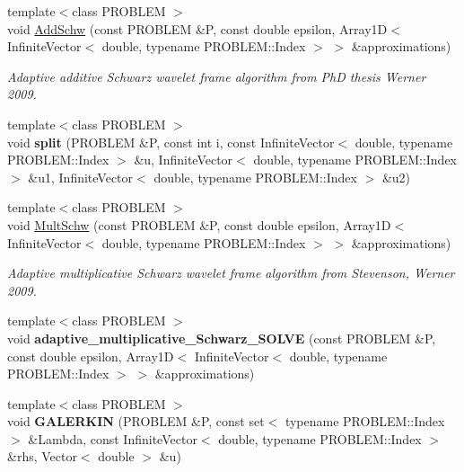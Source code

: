 \begin{CompactItemize}
\item 
{\footnotesize template$<$class PROBLEM $>$ }\\void \hyperlink{namespaceFrameTL_fae0f5be715e2324d15ca01a18665855}{AddSchw} (const PROBLEM \&P, const double epsilon, Array1D$<$ InfiniteVector$<$ double, typename PROBLEM::Index $>$ $>$ \&approximations)
\begin{CompactList}\small\item\em Adaptive additive Schwarz wavelet frame algorithm from PhD thesis Werner 2009. \item\end{CompactList}\item 
\hypertarget{namespaceFrameTL_9af3764c23011a0c0d4ceb60995cae01}{
{\footnotesize template$<$class PROBLEM $>$ }\\void \textbf{split} (PROBLEM \&P, const int i, const InfiniteVector$<$ double, typename PROBLEM::Index $>$ \&u, InfiniteVector$<$ double, typename PROBLEM::Index $>$ \&u1, InfiniteVector$<$ double, typename PROBLEM::Index $>$ \&u2)}
\label{namespaceFrameTL_9af3764c23011a0c0d4ceb60995cae01}

\item 
{\footnotesize template$<$class PROBLEM $>$ }\\void \hyperlink{namespaceFrameTL_a6fc7f7f5f218c3dc3e34081b4e7464d}{MultSchw} (const PROBLEM \&P, const double epsilon, Array1D$<$ InfiniteVector$<$ double, typename PROBLEM::Index $>$ $>$ \&approximations)
\begin{CompactList}\small\item\em Adaptive multiplicative Schwarz wavelet frame algorithm from Stevenson, Werner 2009. \item\end{CompactList}\item 
\hypertarget{namespaceFrameTL_3ee8bc795a39cbc2a1084ff7f9735da1}{
{\footnotesize template$<$class PROBLEM $>$ }\\void \textbf{adaptive\_\-multiplicative\_\-Schwarz\_\-SOLVE} (const PROBLEM \&P, const double epsilon, Array1D$<$ InfiniteVector$<$ double, typename PROBLEM::Index $>$ $>$ \&approximations)}
\label{namespaceFrameTL_3ee8bc795a39cbc2a1084ff7f9735da1}

\item 
\hypertarget{namespaceFrameTL_c081a164d56c41204ca6981f3eca36a7}{
{\footnotesize template$<$class PROBLEM $>$ }\\void \textbf{GALERKIN} (PROBLEM \&P, const set$<$ typename PROBLEM::Index $>$ \&Lambda, const InfiniteVector$<$ double, typename PROBLEM::Index $>$ \&rhs, Vector$<$ double $>$ \&u)}
\label{namespaceFrameTL_c081a164d56c41204ca6981f3eca36a7}


\end{CompactItemize}
